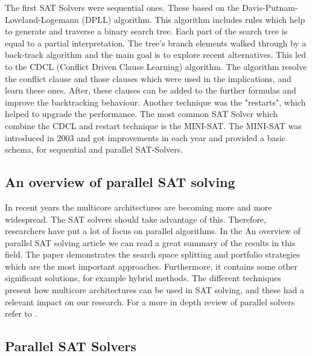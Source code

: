 \documentclass{article}
\begin{document}
The first SAT Solvers were sequential ones. These based on the Davis-Putnam-Loveland-Logemann (DPLL) algorithm. This algorithm includes rules which help to generate and traverse a binary search tree. Each part of the search tree is equal to a partial interpretation. The tree's branch elements walked through by a back-track algorithm and the main goal is to explore recent alternatives. This led to the CDCL (Conflict Driven Clause Learning) algorithm. The algorithm resolve the conflict clause and those clauses which were used in the implications, and learn these ones. After, these clauses can be added to the further formulas and improve the backtracking behaviour. Another technique was the "restarts", which helped to upgrade the performance. The most common SAT Solver which combine the CDCL and restart technique is the MINI-SAT. The MINI-SAT was introduced in 2003 and got improvements in each year and provided a basic schema, for sequential and parallel SAT-Solvers.


\subsection{An overview of parallel SAT solving}

In recent years the multicore architectures are becoming more and more wide\-spread. The SAT solvers should take advantage of this. Therefore, researchers have put a lot of focus on parallel algorithms. In the An overview of parallel SAT solving article we can read a great summary of the results in this field. The paper demonstrates the search space splitting and portfolio strategies which are the most important approaches. Furthermore, it contains some other significant solutions, for example hybrid methods. The different techniques present how multicore architectures can be used in SAT solving, and these had a relevant impact on our research. For a more in depth review of parallel solvers refer to \cite{paralellSAT}.


\subsection{Parallel SAT Solvers}
\end{document}
